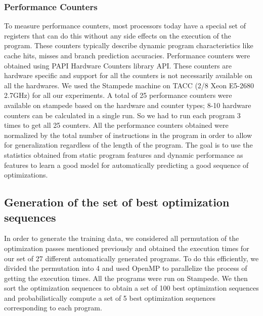 \documentclass[10pt]{sigplanconf}
\begin{document}
\subsubsection{Performance Counters}
To measure performance counters, most processors today have a special set of registers that can do this without any side effects on the execution of the program. These counters typically describe dynamic program characteristics like cache hits, misses and branch prediction accuracies. Performance counters were obtained using PAPI Hardware Counters library API. These counters are hardware specific and support for all the counters is not necessarily available on all the hardwares. We used the Stampede machine on TACC (2/8 Xeon E5-2680 2.7GHz) for all our experiments. A total of 25 performance counters were available on stampede based on the hardware and counter types; 8-10 hardware counters can be calculated in a single run. So we had to run each program 3 times to get all 25 counters. All the performance counters obtained were normalized by the total number of instructions in the program in order to allow for generalization regardless of the length of the program. The goal is to use the statistics obtained from static program features and dynamic performance as features to learn a good model for automatically predicting a good sequence of optimizations. 



\subsection{ Generation of the set of best optimization sequences}
In order to generate the training data, we considered all permutation of the optimization passes mentioned previously and obtained the execution times for our set of 27 different automatically generated programs. To do this efficiently, we divided the permutation into 4 and used OpenMP to parallelize the process of getting the execution times. All the programs were run on Stampede. We then sort the optimization sequences to obtain a set of 100 best optimization sequences and probabilistically compute a set of 5 best optimization sequences corresponding to each program.  
\end{document}
